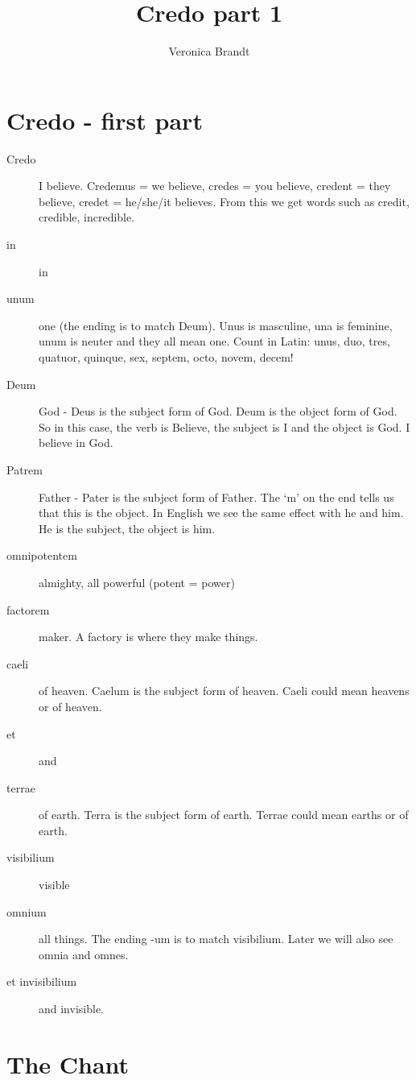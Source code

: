 \documentclass[12pt,a4paper]{article}
\title{Credo part 1}
\author{Veronica Brandt}
\begin{document}
\autocompilegabc


\maketitle

\section{Credo - first part}

\begin{description}
\item[Credo] I believe.  Credemus = we believe, credes = you believe, credent = they believe, credet = he/she/it believes.  From this we get words such as credit, credible, incredible.
\item[in] in
\item[unum] one (the ending is to match Deum).  Unus is masculine, una is feminine, unum is neuter and they all mean one.  Count in Latin: unus, duo, tres, quatuor, quinque, sex, septem, octo, novem, decem!
\item[Deum] God - Deus is the subject form of God.  Deum is the object form of God.  So in this case, the verb is Believe, the subject is I and the object is God.  I believe in God.
\item[Patrem] Father - Pater is the subject form of Father.  The `m' on the end tells us that this is the object.  In English we see the same effect with he and him.  He is the subject, the object is him.
\item[omnipotentem] almighty, all powerful (potent = power)
\item[factorem] maker.  A factory is where they make things.
\item[caeli] of heaven.  Caelum is the subject form of heaven.  Caeli could mean heavens or of heaven.
\item[et] and
\item[terrae] of earth.  Terra is the subject form of earth.  Terrae could mean earths or of earth.
\item[visibilium] visible
\item[omnium] all things.  The ending -um is to match visibilium.  Later we will also see omnia and omnes.
\item[et invisibilium] and invisible.
\end{description}

\section{The Chant}
\end{document}
